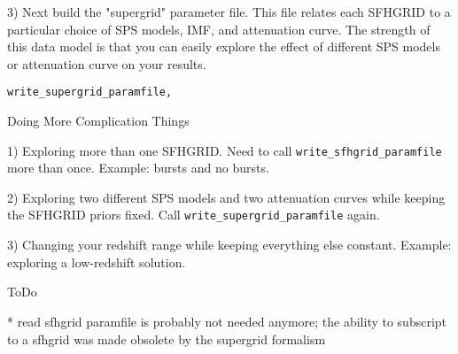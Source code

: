 \documentclass[12pt,preprint]{aastex}
\newcommand{\sfhpro}{{\tt write\_sfhgrid\_paramfile}}
\newcommand{\superpro}{{\tt write\_supergrid\_paramfile}}
\begin{document}
3) Next build the "supergrid" parameter file.  This file relates each
SFHGRID to a particular choice of SPS models, IMF, and attenuation
curve.  The strength of this data model is that you can easily explore
the effect of different SPS models or attenuation curve on your
results.

\begin{verbatim}
write_supergrid_paramfile, 
\end{verbatim}


%   
%   


Doing More Complication Things

1) Exploring more than one SFHGRID.  Need to call \sfhpro{} more than
once.  Example: bursts and no bursts.

2) Exploring two different SPS models and two attenuation curves while
keeping the SFHGRID priors fixed.  Call \superpro{} again.

3) Changing your redshift range while keeping everything else
constant.  Example: exploring a low-redshift solution.


ToDo

* read sfhgrid paramfile is probably not needed anymore; the ability
to subscript to a sfhgrid was made obsolete by the supergrid formalism
\end{document}

